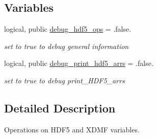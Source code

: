 \subsection*{Variables}
\begin{DoxyCompactItemize}
\item 
logical, public \hyperlink{namespacehdf5__ops_a9b7c63811a63e9454539f1a2c89678b4}{debug\+\_\+hdf5\+\_\+ops} = .false.
\begin{DoxyCompactList}\small\item\em set to true to debug general information \end{DoxyCompactList}\item 
logical, public \hyperlink{namespacehdf5__ops_a00bbaa77652e040350c9726668cc22ac}{debug\+\_\+print\+\_\+hdf5\+\_\+arrs} = .false.
\begin{DoxyCompactList}\small\item\em set to true to debug print\+\_\+\+H\+D\+F5\+\_\+arrs \end{DoxyCompactList}\end{DoxyCompactItemize}


\subsection{Detailed Description}
Operations on H\+D\+F5 and X\+D\+MF variables. 

